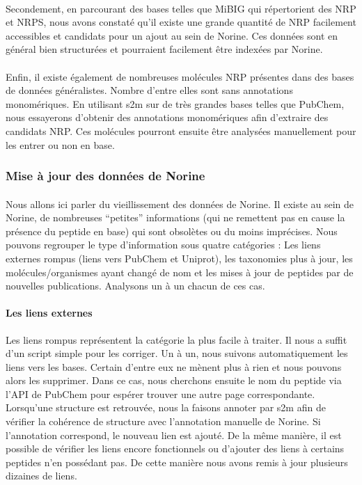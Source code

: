 \documentclass[12pt,french,twoside]{report}
\begin{document}
\paragraph{}Secondement, en parcourant des bases telles que MiBIG qui répertorient des NRP et NRPS, nous avons constaté qu'il existe une grande quantité de NRP facilement accessibles et candidats pour un ajout au sein de Norine.
Ces données sont en général bien structurées et pourraient facilement être indexées par Norine.

\paragraph{}Enfin, il existe également de nombreuses molécules NRP présentes dans des bases de données généralistes.
Nombre d'entre elles sont sans annotations monomériques.
En utilisant s2m sur de très grandes bases telles que PubChem, nous essayerons d'obtenir des annotations monomériques afin d'extraire des candidats NRP.
Ces molécules pourront ensuite être analysées manuellement pour les entrer ou non en base.


\subsubsection{Mise à jour des données de Norine}

\paragraph{}Nous allons ici parler du vieillissement des données de Norine.
Il existe au sein de Norine, de nombreuses ``petites'' informations (qui ne remettent pas en cause la présence du peptide en base) qui sont obsolètes ou du moins imprécises.
Nous pouvons regrouper le type d'information sous quatre catégories : Les liens externes rompus (liens vers PubChem et Uniprot), les taxonomies plus à jour, les molécules/organismes ayant changé de nom et les mises à jour de peptides par de nouvelles publications.
Analysons un à un chacun de ces cas.


\paragraph{Les liens externes}
Les liens rompus représentent la catégorie la plus facile à traiter.
Il nous a suffit d'un script simple pour les corriger.
Un à un, nous suivons automatiquement les liens vers les bases.
Certain d'entre eux ne mènent plus à rien et nous pouvons alors les supprimer.
Dans ce cas, nous cherchons ensuite le nom du peptide via l'API de PubChem pour espérer trouver une autre page correspondante.
Lorsqu'une structure est retrouvée, nous la faisons annoter par s2m afin de vérifier la cohérence de structure avec l'annotation manuelle de Norine.
Si l'annotation correspond, le nouveau lien est ajouté.
De la même manière, il est possible de vérifier les liens encore fonctionnels ou d'ajouter des liens à certains peptides n'en possédant pas.
De cette manière nous avons remis à jour plusieurs dizaines de liens.
\end{document}
